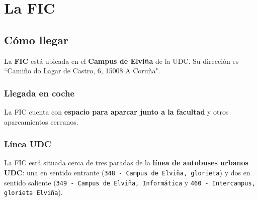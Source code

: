 \chapter{La FIC}

\section{Cómo llegar}

La \textbf{\acrfull{FIC}} está ubicada en el \textbf{Campus de Elviña} de la \acrshort{UDC}. Su dirección es ``Camiño do Lagar de Castro, 6, 15008 A Coruña".

\subsection{Llegada en coche}

La \acrshort{FIC} cuenta con \textbf{espacio para aparcar junto a la facultad} y otros aparcamientos cercanos.

\FloatBarrier
\begin{figure}[htp]
    \centering
\end{figure}
\FloatBarrier

\subsection{Línea UDC}

La \acrshort{FIC} está situada cerca de tres paradas de la \textbf{línea de autobuses urbanos \acrshort{UDC}}: una en sentido entrante (\texttt{348 - Campus de Elviña, glorieta}) y dos en sentido saliente (\texttt{349 - Campus de Elviña, Informática} y \texttt{460 - Intercampus, glorieta Elviña}).

\FloatBarrier
\begin{figure}[htp]
    \centering
\end{figure}
\FloatBarrier

